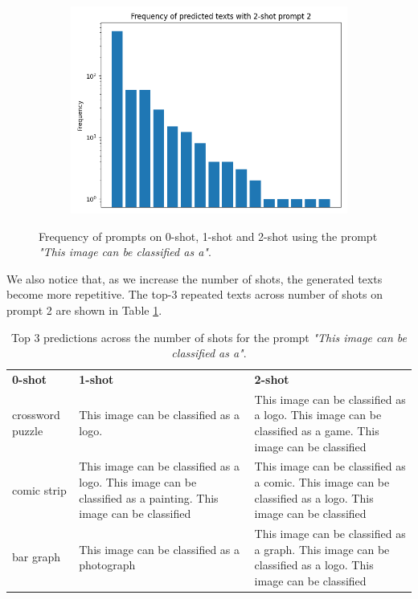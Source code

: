 \begin{figure}[ht]
\begin{subfigure}{0.31\textwidth}
        \includegraphics[width=\linewidth]{Images/2-shot_prompt_2_freq_plot.png}
    \end{subfigure}

    \caption{Frequency of prompts on 0-shot, 1-shot and 2-shot using the prompt \textit{"This image can be classified as a"}.}
    \label{fig:freq-plot}
\end{figure} 

We also notice that, as we increase the number of shots, the generated texts become more repetitive. The top-3 repeated texts across number of shots on prompt 2 are shown in Table \ref{tab:top-preds}.


\begin{table}[ht]
    \centering
    \begin{tabular}{|p{2.5cm}|p{6cm}|p{6cm}|}
        \hline
        \rowcolor{lightgray}\textbf{0-shot} & \textbf{1-shot} & \textbf{2-shot}\\
        \rowcolor{white} crossword puzzle & This image can be classified as a logo. & This image can be classified as a logo. This image can be classified as a game. This image can be classified\\
        \rowcolor{white} comic strip & This image can be classified as a logo. This image can be classified as a painting. This image can be classified & This image can be classified as a comic. This image can be classified as a logo. This image can be classified\\
        \rowcolor{white} bar graph & This image can be classified as a photograph & This image can be classified as a graph. This image can be classified as a logo. This image can be classified\\
        \hline
    \end{tabular}
    \caption{Top 3 predictions across the number of shots for the prompt \textit{"This image can be classified as a"}.}
    \label{tab:top-preds}
\end{table}


